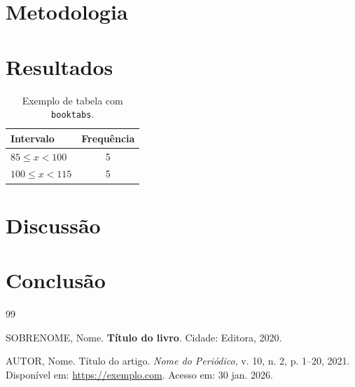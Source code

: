 \documentclass[a4paper,12pt]{article}
\begin{document}
\lipsum[4]

\section{Metodologia}
\lipsum[5]

\section{Resultados}
\lipsum[6]

\begin{table}[H]
\centering
\caption{Exemplo de tabela com \texttt{booktabs}.}
\label{tab:exemplo}
\setlength{\tabcolsep}{12pt}
\renewcommand{\arraystretch}{1.2}
\begin{tabular}{lc}
\toprule
\textbf{Intervalo} & \textbf{Frequência} \\
\midrule
$85 \le x < 100$  & 5 \\
$100 \le x < 115$ & 5 \\
\bottomrule
\end{tabular}
\end{table}

\section{Discussão}
\lipsum[7]

\section{Conclusão}
\lipsum[8]

\newpage
{}
{}
\begin{thebibliography}{99}

SOBRENOME, Nome.
\textbf{Título do livro}.
Cidade: Editora, 2020.

AUTOR, Nome.
Título do artigo.
\textit{Nome do Periódico}, v. 10, n. 2, p. 1--20, 2021.
Disponível em: \url{https://exemplo.com}. Acesso em: 30 jan. 2026.

\end{thebibliography}
\end{document}
